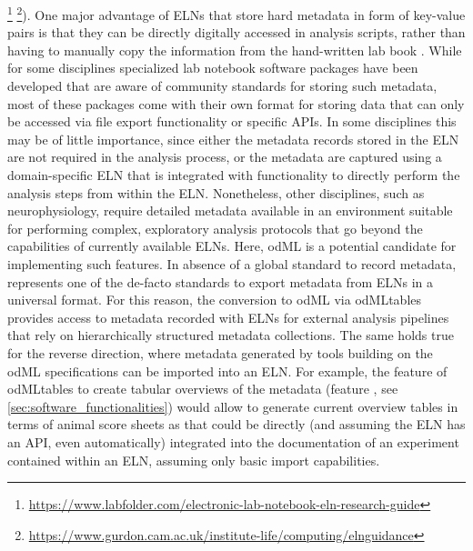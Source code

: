 {\footnote{\url{https://www.labfolder.com/electronic-lab-notebook-eln-research-guide}} \footnote{\url{https://www.gurdon.cam.ac.uk/institute-life/computing/elnguidance}}). One major advantage of ELNs that store hard metadata \citep{Grewe_2011} in form of key-value pairs is that they can be directly digitally accessed in analysis scripts, rather than having to manually copy the information from the hand-written lab book \citep{Zehl_2016}. While for some disciplines specialized lab notebook software packages have been developed \citep{Kwok_2018} that are aware of community standards for storing such metadata, most of these packages come with their own format for storing data that can only be accessed via file export functionality or specific APIs. In some disciplines this may be of little importance, since either the metadata records stored in the ELN are not required in the analysis process, or the metadata are captured using a domain-specific ELN that is integrated with functionality to directly perform the analysis steps from within the ELN. Nonetheless, other disciplines, such as neurophysiology, require detailed metadata available in an environment suitable for performing complex, exploratory analysis protocols that go beyond the capabilities of currently available ELNs. Here, odML is a potential candidate for implementing such features. In absence of a global standard to record metadata,  represents one of the de-facto standards to export metadata from ELNs in a universal format. For this reason, the conversion to odML via odMLtables provides access to metadata recorded with ELNs for external analysis pipelines that rely on hierarchically structured metadata collections. The same holds true for the reverse direction, where metadata generated by tools building on the odML specifications can be imported into an ELN. For example, the feature of odMLtables to create tabular overviews of the metadata (feature \fcompare, see \cref{sec:software_functionalities}) would allow to generate current overview tables in terms of animal score sheets as  that could be directly (and assuming the ELN has an API, even automatically) integrated into the documentation of an experiment contained within an ELN, assuming only basic  import capabilities. 

}
